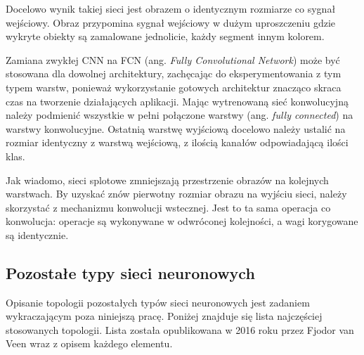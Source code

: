 \documentclass[12pt,a4paper,twoside,titlepage,openright]{book}
\begin{document}
Docelowo wynik takiej sieci jest obrazem o identycznym rozmiarze co sygnał wejściowy. Obraz przypomina sygnał wejściowy w dużym uproszczeniu gdzie wykryte obiekty są zamalowane jednolicie, każdy segment innym kolorem.

Zamiana zwykłej CNN na FCN (ang. \textit{Fully Convolutional Network}) może być stosowana dla dowolnej architektury, zachęcając do eksperymentowania z tym typem warstw, ponieważ wykorzystanie gotowych architektur znacząco skraca czas na tworzenie działających aplikacji. Mając wytrenowaną sieć konwolucyjną należy podmienić wszystkie w pełni połączone warstwy (ang. \textit{fully connected}) na warstwy konwolucyjne. Ostatnią warstwę wyjściową docelowo należy ustalić na rozmiar identyczny z warstwą wejściową, z ilością kanałów odpowiadającą ilości klas.

Jak wiadomo, sieci splotowe zmniejszają przestrzenie obrazów na kolejnych warstwach. By uzyskać znów pierwotny rozmiar obrazu na wyjściu sieci, należy skorzystać z mechanizmu konwolucji wstecznej. Jest to ta sama operacja co konwolucja: operacje są wykonywane w odwróconej kolejności, a wagi korygowane są identycznie.\cite{DBLP:journals/corr/LongSD14}

\subsection{Pozostałe typy sieci neuronowych}
Opisanie topologii pozostałych typów sieci neuronowych jest zadaniem wykraczającym poza niniejszą pracę. Poniżej znajduje się lista najczęściej stosowanych topologii. Lista została opublikowana w 2016 roku przez Fjodor van Veen wraz z opisem każdego elementu.\cite{siteFjodorList}
\end{document}
